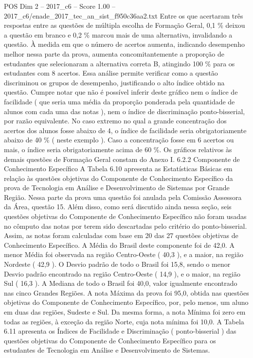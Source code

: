 \begin{textsample}{POS Dim 2 – 2017\_c6 – Score 1.00 – 2017\_c6/enade\_2017\_tec\_an\_sist\_f950c36aa2.txt}
Entre os que acertaram três respostas entre as questões de múltipla escolha de Formação Geral, 0,1 \% deixou a questão em branco e 0,2 \% marcou mais de uma alternativa, invalidando a questão.
À medida em que o número de acertos aumenta, indicando desempenho melhor nessa parte da prova, aumenta concomitantemente a proporção de estudantes que selecionaram a alternativa correta B, atingindo 100 \% para os estudantes com 8 acertos.
Essa análise permite verificar como a questão discriminou os grupos de desempenho, justificando o alto índice obtido na questão.
Cumpre notar que não é possível inferir deste gráfico nem o índice de facilidade ( que seria uma média da proporção ponderada pela quantidade de alunos com cada uma das notas ), nem o índice de discriminação ponto-bisserial, por razão equivalente.
No caso extremo no qual a grande concentração dos acertos dos alunos fosse abaixo de 4, o índice de facilidade seria obrigatoriamente abaixo de 40 \% ( neste exemplo ).
Caso a concentração fosse em 6 acertos ou mais, o índice seria obrigatoriamente acima de 60 \%.
Os gráficos relativos às demais questões de Formação Geral constam do Anexo I. 6.2.2 Componente de Conhecimento Específico A Tabela 6.10 apresenta as Estatísticas Básicas em relação às questões objetivas do Componente de Conhecimento Específico da prova de Tecnologia em Análise e Desenvolvimento de Sistemas por Grande Região.
Nessa parte da prova uma questão foi anulada pela Comissão Assessora da Área, questão 15.
Além disso, como será discutido ainda nessa seção, seis questões objetivas do Componente de Conhecimento Específico não foram usadas no cômputo das notas por terem sido descartadas pelo critério do ponto-bisserial.
Assim, as notas foram calculadas com base em 20 das 27 questões objetivas de Conhecimento Específico.
A Média do Brasil deste componente foi de 42,0.
A menor Média foi observada na região Centro-Oeste ( 40,3 ), e a maior, na região Nordeste ( 42,9 ).
O Desvio padrão de todo o Brasil foi 15,8, sendo o menor Desvio padrão encontrado na região Centro-Oeste ( 14,9 ), e o maior, na região Sul ( 16,3 ).
A Mediana de todo o Brasil foi 40,0, valor igualmente encontrado nas cinco Grandes Regiões.
A nota Máxima da prova foi 95,0, obtida nas questões objetivas do Componente de Conhecimento Específico, por, pelo menos, um aluno em duas das regiões, Sudeste e Sul.
Da mesma forma, a nota Mínima foi zero em todas as regiões, à exceção da região Norte, cuja nota mínima foi 10,0.
A Tabela 6.11 apresenta os Índices de Facilidade e Discriminação ( ponto-bisserial ) das questões objetivas do Componente de Conhecimento Específico para os estudantes de Tecnologia em Análise e Desenvolvimento de Sistemas.

\end{textsample}

